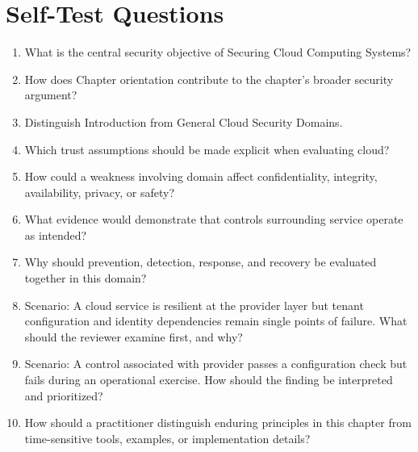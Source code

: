 \documentclass[11pt]{article}
\begin{document}
\section*{Self-Test Questions}
\begin{enumerate}
\item What is the central security objective of Securing Cloud Computing Systems?
\item How does Chapter orientation contribute to the chapter's broader security argument?
\item Distinguish Introduction from General Cloud Security Domains.
\item Which trust assumptions should be made explicit when evaluating cloud?
\item How could a weakness involving domain affect confidentiality, integrity, availability, privacy, or safety?
\item What evidence would demonstrate that controls surrounding service operate as intended?
\item Why should prevention, detection, response, and recovery be evaluated together in this domain?
\item Scenario: A cloud service is resilient at the provider layer but tenant configuration and identity dependencies remain single points of failure. What should the reviewer examine first, and why?
\item Scenario: A control associated with provider passes a configuration check but fails during an operational exercise. How should the finding be interpreted and prioritized?
\item How should a practitioner distinguish enduring principles in this chapter from time-sensitive tools, examples, or implementation details?
\end{enumerate}
\end{document}
